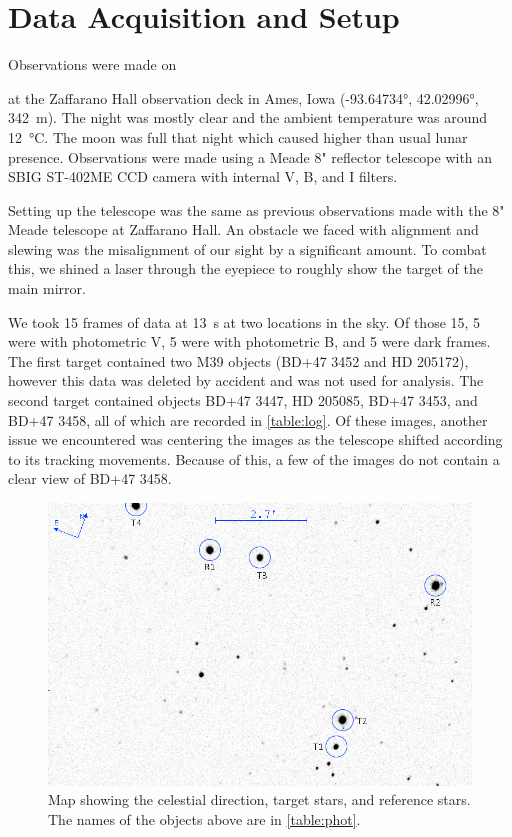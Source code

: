 \documentclass[%
aip,
jmp,
reprint,
floatfix
]{revtex4-1}
\begin{document}
	\section{Data Acquisition and Setup}
	Observations were made on \date{06 September 2017} at the Zaffarano Hall observation deck in Ames, Iowa (\ang{-93.64734}, \ang{42.02996}, \SI{342}{\meter}). The night was mostly clear and the ambient temperature was around \SI{12}{\degreeCelsius}. The moon was full that night which caused higher than usual lunar presence. Observations were made using a Meade 8" reflector telescope with an SBIG ST-402ME CCD camera with internal V, B, and I filters. 
	
	Setting up the telescope was the same as previous observations made with the 8" Meade telescope at Zaffarano Hall. An obstacle we faced with alignment and slewing was the misalignment of our sight by a significant amount. To combat this, we shined a laser through the eyepiece to roughly show the target of the main mirror.
	
	We took 15 frames of data at \SI{13}{\second} at two locations in the sky. Of those 15, 5 were with photometric V, 5 were with photometric B, and 5 were dark frames. The first target contained two M39 objects (BD+47 3452 and HD 205172), however this data was deleted by accident and was not used for analysis. The second target contained objects BD+47 3447, HD 205085, BD+47 3453, and BD+47 3458, all of which are recorded in \autoref{table:log}. Of these images, another issue we encountered was centering the images as the telescope shifted according to its tracking movements. Because of this, a few of the images do not contain a clear view of BD+47 3458.
	
	\begin{figure}[]
		\includegraphics[width=\linewidth]{figs/M39_map.png}
		\caption{Map showing the celestial direction, target stars, and reference stars. The names of the objects above are in \autoref{table:phot}.}
		\label{fig:map}
			
	\end{figure}
\end{document}

